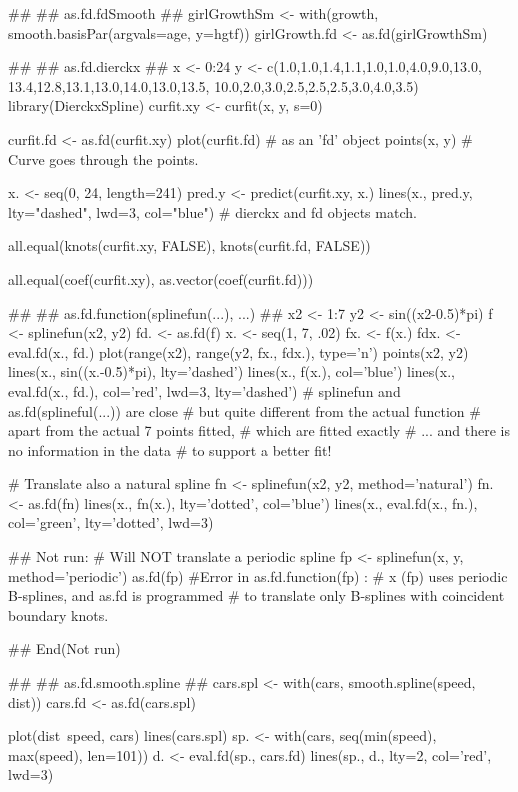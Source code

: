 \documentclass{article}
\begin{document}
\begin{Examples}
\begin{ExampleCode}
##
## as.fd.fdSmooth
##
girlGrowthSm <- with(growth, smooth.basisPar(argvals=age, y=hgtf))
girlGrowth.fd <- as.fd(girlGrowthSm)

##
## as.fd.dierckx
##
x <- 0:24
y <- c(1.0,1.0,1.4,1.1,1.0,1.0,4.0,9.0,13.0,
       13.4,12.8,13.1,13.0,14.0,13.0,13.5,
       10.0,2.0,3.0,2.5,2.5,2.5,3.0,4.0,3.5)
library(DierckxSpline) 
curfit.xy <- curfit(x, y, s=0)

curfit.fd <- as.fd(curfit.xy)
plot(curfit.fd) # as an 'fd' object 
points(x, y) # Curve goes through the points.  

x. <- seq(0, 24, length=241)
pred.y <- predict(curfit.xy, x.) 
lines(x., pred.y, lty="dashed", lwd=3, col="blue")
# dierckx and fd objects match.


all.equal(knots(curfit.xy, FALSE), knots(curfit.fd, FALSE))


all.equal(coef(curfit.xy), as.vector(coef(curfit.fd)))




##
## as.fd.function(splinefun(...), ...) 
## 
x2 <- 1:7
y2 <- sin((x2-0.5)*pi)
f <- splinefun(x2, y2)
fd. <- as.fd(f)
x. <- seq(1, 7, .02)
fx. <- f(x.)
fdx. <- eval.fd(x., fd.) 
plot(range(x2), range(y2, fx., fdx.), type='n')
points(x2, y2)
lines(x., sin((x.-0.5)*pi), lty='dashed') 
lines(x., f(x.), col='blue')
lines(x., eval.fd(x., fd.), col='red', lwd=3, lty='dashed')
# splinefun and as.fd(splineful(...)) are close
# but quite different from the actual function
# apart from the actual 7 points fitted,
# which are fitted exactly
# ... and there is no information in the data
# to support a better fit!

# Translate also a natural spline 
fn <- splinefun(x2, y2, method='natural')
fn. <- as.fd(fn)
lines(x., fn(x.), lty='dotted', col='blue')
lines(x., eval.fd(x., fn.), col='green', lty='dotted', lwd=3)

## Not run: 
# Will NOT translate a periodic spline
fp <- splinefun(x, y, method='periodic')
as.fd(fp)
#Error in as.fd.function(fp) : 
#  x (fp)  uses periodic B-splines, and as.fd is programmed
#   to translate only B-splines with coincident boundary knots.

## End(Not run)

##
## as.fd.smooth.spline
##
cars.spl <- with(cars, smooth.spline(speed, dist))
cars.fd <- as.fd(cars.spl)

plot(dist~speed, cars)
lines(cars.spl)
sp. <- with(cars, seq(min(speed), max(speed), len=101))
d. <- eval.fd(sp., cars.fd)
lines(sp., d., lty=2, col='red', lwd=3)
\end{ExampleCode}
\end{Examples}
\end{document}
